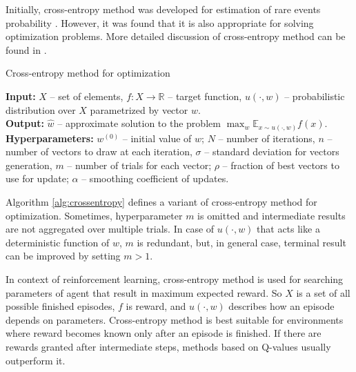 \documentclass{article}
\begin{document}
Initially, cross-entropy method was developed for estimation of rare events probability \cite{rubinstein1997optimization}. However, it was found that it is also appropriate for solving optimization problems. More detailed discussion of cross-entropy method can be found in \cite{boer2005tutorial}.

\begin{algorithm}
	\caption{Cross-entropy method for optimization} \label{alg:crossentropy}
	\textbf{Input:} $X$ -- set of elements, $f: X \to \mathbb{R}$ -- target function, $u(\cdot, w)$ -- probabilistic distribution over $X$ parametrized by vector $w$. \\
	\textbf{Output:} $\hat{w}$ -- approximate solution to the problem $\max_w \mathbb{E}_{x \sim u(\cdot, w)} f(x)$. \\
	\textbf{Hyperparameters:} $w^{(0)}$ -- initial value of $w$; $N$ -- number of iterations, $n$ -- number of vectors to draw at each iteration, $\sigma$ -- standard deviation for vectors generation, $m$ -- number of trials for each vector; $\rho$ -- fraction of best vectors to use for update; $\alpha$ -- smoothing coefficient of updates.
	\begin{algorithmic}[1]
		    \ENDFOR
		\ENDFOR
	\end{algorithmic}
\end{algorithm}

Algorithm \ref{alg:crossentropy} defines a variant of cross-entropy method for optimization. Sometimes, hyperparameter $m$ is omitted and intermediate results are not aggregated over multiple trials. In case of $u(\cdot, w)$ that acts like a deterministic function of $w$, $m$ is redundant, but, in general case, terminal result can be improved by setting $m > 1$.

In context of reinforcement learning, cross-entropy method is used for searching parameters of agent that result in maximum expected reward. So $X$ is a set of all possible finished episodes, $f$ is reward, and $u(\cdot, w)$ describes how an episode depends on parameters. Cross-entropy method is best suitable for environments where reward becomes known only after an episode is finished. If there are rewards granted after intermediate steps, methods based on Q-values usually outperform it.
\end{document}
